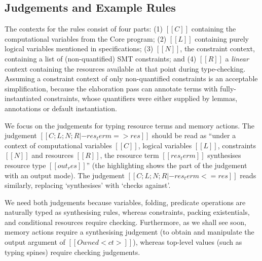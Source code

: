 \documentclass[11pt]{article}%
\begin{document}
\subsection{Judgements and Example Rules}
\label{subsec:judgm_eg_rules}

The contexts for the rules consist of four parts: (1) $[[ C ]]$ containing the
computational variables from the Core program; (2) $[[ L ]]$ containing purely
logical variables mentioned in specifications; (3) $[[ N ]]$, the constraint
context, containing a list of (non-quantified) SMT constraints; and (4) $[[ R ]]$ a
\emph{linear} context containing the resources available at that point during
type-checking. Assuming a constraint context of only non-quantified constraints
is an acceptable simplification, because the elaboration pass can annotate terms
with fully-instantiated constraints, whose quantifiers were either supplied
by lemmas, annotations or default instantiation.

We focus on the judgements for typing resource terms and memory actions. The
judgement $[[ C ; L ; N ; R |- res_term => res ]]$ should be read as ``under a
context of computational variables $[[ C ]]$, logical variables $[[ L ]]$,
constraints $[[ N ]]$ and resources $[[ R ]]$, the resource term
$[[ res_term ]]$ synthesises resource type $[[ out_res ]]$'' (the highlighting shows the
part of the judgement with an \colorbox{red!10}{output mode}). The judgement
$[[ C ; L ; N ; R |- res_term <= res ]]$ reads similarly, replacing
`synthesises' with `checks against'.

We need both judgements because variables, folding, predicate operations are
naturally typed as synthesising rules, whereas constraints, packing
existentials, and conditional resources require checking.  Furthermore, as we
shall see soon, memory actions require a synthesising judgement (to obtain and
manipulate the output argument of $[[ Owned < ct > ]]$), whereas top-level
values (such as typing spines) require checking judgements.
\end{document}
